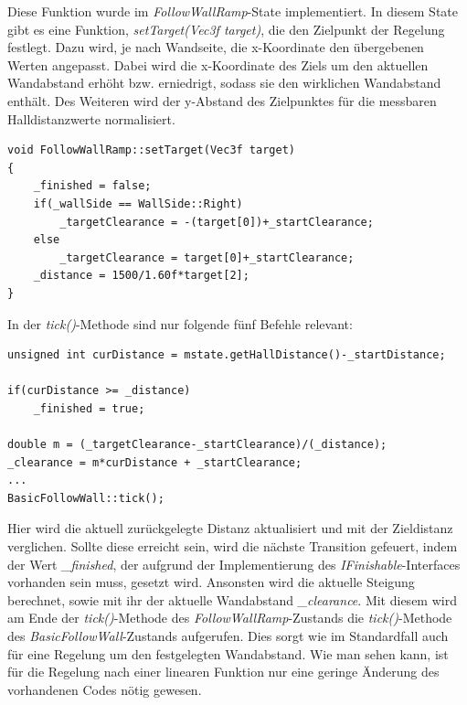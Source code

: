 \newline
\newline
Diese Funktion wurde im \textit{FollowWallRamp}-State implementiert. In diesem State gibt es eine Funktion, \textit{setTarget(Vec3f target)}, die den Zielpunkt der Regelung festlegt. Dazu wird, je nach Wandseite, die x-Koordinate den übergebenen Werten angepasst. Dabei wird die x-Koordinate des Ziels um den aktuellen Wandabstand erhöht bzw. erniedrigt, sodass sie den wirklichen Wandabstand enthält. Des Weiteren wird der y-Abstand des Zielpunktes für die messbaren Halldistanzwerte normalisiert.
\newpage
\begin{lstlisting}
void FollowWallRamp::setTarget(Vec3f target)
{
	_finished = false;
	if(_wallSide == WallSide::Right)
		_targetClearance = -(target[0])+_startClearance;
	else
		_targetClearance = target[0]+_startClearance;
	_distance = 1500/1.60f*target[2];
}
\end{lstlisting}

In der \textit{tick()}-Methode sind nur folgende fünf Befehle relevant:

\begin{lstlisting}
unsigned int curDistance = mstate.getHallDistance()-_startDistance;

if(curDistance >= _distance)
	_finished = true;

double m = (_targetClearance-_startClearance)/(_distance);
_clearance = m*curDistance + _startClearance;
...
BasicFollowWall::tick();
\end{lstlisting}

Hier wird die aktuell zurückgelegte Distanz aktualisiert und mit der Zieldistanz verglichen. Sollte diese erreicht sein, wird die nächste Transition gefeuert, indem der Wert \textit{\_finished}, der aufgrund der Implementierung des \textit{IFinishable}-Interfaces vorhanden sein muss, gesetzt wird. Ansonsten wird die aktuelle Steigung berechnet, sowie mit ihr der aktuelle Wandabstand \textit{\_clearance}. Mit diesem wird am Ende der \textit{tick()}-Methode des \textit{FollowWallRamp}-Zustands die \textit{tick()}-Methode des \textit{BasicFollowWall}-Zustands aufgerufen. Dies sorgt wie im Standardfall auch für eine Regelung um den festgelegten Wandabstand. 
\newline
Wie man sehen kann, ist für die Regelung nach einer linearen Funktion nur eine geringe Änderung des vorhandenen Codes nötig gewesen. 
\newline


